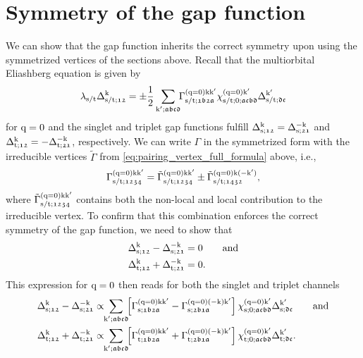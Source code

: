 \documentclass[main.tex]{subfiles}
\begin{document}
\section{Symmetry of the gap function}

We can show that the gap function inherits the correct symmetry upon using the symmetrized vertices of the sections above. Recall that the multiorbital Eliashberg equation is given by 
\begin{align}
	\lambda_{\text{s}/\text{t}}\Delta_{\text{s}/\text{t};\mathfrak{12}}^{\text{k}}=\pm\frac{1}{2}\sum_{\text{k}';\mathfrak{abcd}}\!\!\Gamma^{(\text{q}=0)\text{k}\text{k}'}_{\text{s}/\text{t};\mathfrak{1b2a}}\chi^{(\text{q}=0)\text{k}'}_{\text{s}/\text{t};0;\mathfrak{acbd}}\Delta_{\text{s}/\text{t};\mathfrak{dc}}^{\text{k}'}
\end{align}
for $\text{q}=0$ and the singlet and triplet gap functions fulfill $\Delta_{\text{s};\mathfrak{12}}^{\text{k}}=\Delta_{\text{s};\mathfrak{21}}^{-\text{k}}$ and $\Delta_{\text{t};\mathfrak{12}}^{\text{k}}=-\Delta_{\text{t};\mathfrak{21}}^{-\text{k}}$, respectively. 
We can write $\Gamma$ in the symmetrized form with the irreducible vertices $\tilde{\Gamma}$ from \eqref{eq:pairing_vertex_full_formula} above, i.e.,
\begin{align}\label{eq:symmetrization_pairing_vertex}
	\Gamma^{(\text{q}=0)\text{k}\text{k}'}_{\text{s}/\text{t};\mathfrak{1234}} = \tilde{\Gamma}^{(\text{q}=0)\text{k}\text{k}'}_{\text{s}/\text{t};\mathfrak{1234}}\pm \tilde{\Gamma}^{(\text{q}=0)\text{k}(-\text{k}')}_{\text{s}/\text{t};\mathfrak{1432}},
\end{align}
where $\tilde{\Gamma}^{(\text{q}=0)\text{k}\text{k}'}_{\text{s}/\text{t};\mathfrak{1234}}$ contains both the non-local and local contribution to the irreducible vertex. To confirm that this combination enforces the correct symmetry of the gap function, we need to show that
\begin{subequations}
\begin{align}
	\Delta_{\text{s};\mathfrak{12}}^{\text{k}}-\Delta_{\text{s};\mathfrak{21}}^{-\text{k}}&=0\qquad\text{and}\\
	\Delta_{\text{t};\mathfrak{12}}^{\text{k}}+\Delta_{\text{t};\mathfrak{21}}^{-\text{k}}&=0.
\end{align}
\end{subequations}
This expression for $\text{q}=0$ then reads for both the singlet and triplet channels
\begin{subequations}
\begin{align}
	\Delta_{\sing;\mathfrak{12}}^{\k}-\Delta_{\sing;\mathfrak{21}}^{-\k}&\propto\!\!\sum_{\kp;\mathfrak{abcd}}\!\! \left [\Gamma^{(\q=0)\k\kp}_{\sing;\mathfrak{1b2a}}-\Gamma^{(\q=0)(-\k)\kp}_{\sing;\mathfrak{2b1a}}\right ]\chi^{(\q=0)\kp}_{\sing;0;\mathfrak{acbd}}\Delta_{\sing;\mathfrak{dc}}^{\kp}\label{eq:symmetrization_delta_first_formula_singlet}\qqand\\
	\Delta_{\trip;\mathfrak{12}}^{\k}+\Delta_{\trip;\mathfrak{21}}^{-\k}&\propto\!\!\sum_{\kp;\mathfrak{abcd}}\!\! \left [\Gamma^{(\q=0)\k\kp}_{\trip;\mathfrak{1b2a}}+\Gamma^{(\q=0)(-\k)\kp}_{\trip;\mathfrak{2b1a}}\right ]\chi^{(\q=0)\kp}_{\trip;0;\mathfrak{acbd}}\Delta_{\trip;\mathfrak{dc}}^{\kp}\label{eq:symmetrization_delta_first_formula_triplet}.
\end{align}
\end{subequations}
\end{document}
